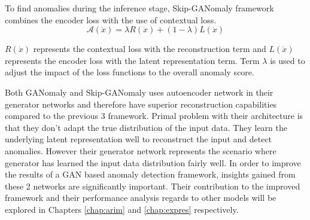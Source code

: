 To find anomalies during the inference stage, Skip-GANomaly framework combines the encoder loss with
the use of contextual loss. 
\begin{equation}
	\label{eqn:sganomaly_as}
    \mathcal{A}(\dot{x})=\lambda R(\dot{x})+(1-\lambda) L(\dot{x})  
\end{equation}

$R(\dot{x})$ represents the contextual loss with the reconstruction term and $L(\dot{x})$ represents
the encoder loss with the latent representation term. Term $\lambda$ is used to adjust the impact of
the loss functions to the overall anomaly score.

Both GANomaly and Skip-GANomaly uses autoencoder network in their generator networks
and therefore have superior reconstruction capabilities compared to the previous 3 framework.
Primal problem with their architecture is that they don't adapt the true distribution of the input
data. They learn the underlying latent representation well to reconstruct the input and detect
anomalies. However their generator network represents the scenario where generator has learned the
input data distribution fairly well. In order to improve the results of a GAN based anomaly
detection framework, insights gained from these 2 networks are significantly important. Their
contribution to the improved framework and their performance analysis regards to other models will
be explored in Chapters \ref{chap:arim} and \ref{chap:expres} respectively. 


\endgroup
